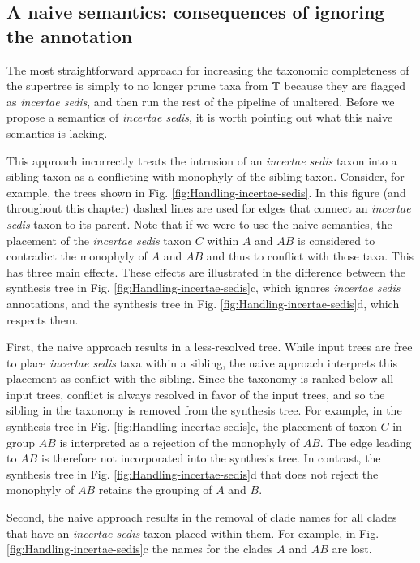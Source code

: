 \documentclass[english]{article}
\begin{document}
\subsection{A naive semantics: consequences of ignoring the annotation}

The most straightforward approach for increasing the taxonomic completeness of
the supertree is simply to no longer prune taxa from $\mbox{\ensuremath{\mathbb{T}}}$ because they are flagged
as \emph{incertae sedis}, and then run the rest of the pipeline of
\citet{redelings2017supertree} unaltered.  Before we propose a semantics of
\emph{incertae sedis}, it is worth pointing out what this naive semantics is lacking.

This approach incorrectly treats the intrusion of an \emph{incertae sedis} taxon
into a sibling taxon as a conflicting with monophyly of the sibling taxon.
Consider, for example, the trees shown in Fig. \ref{fig:Handling-incertae-sedis}.
In this figure (and throughout this chapter) dashed lines are used for edges that
connect an \emph{incertae sedis} taxon to its parent.
Note that if we were to use the naive semantics,  the placement of the
\emph{incertae sedis} taxon $C$ within $A$ and $AB$ is considered
to contradict the monophyly of $A$ and $AB$ and thus to conflict with those taxa.
This has three main effects.  These effects are illustrated in the difference
between the synthesis tree in Fig. \ref{fig:Handling-incertae-sedis}c, which
ignores \emph{incertae sedis} annotations, and the synthesis tree in Fig.
\ref{fig:Handling-incertae-sedis}d, which respects them.

First, the naive approach results in a less-resolved tree.  While input trees are
free to place \emph{incertae sedis} taxa within a sibling, the naive approach
interprets this placement as conflict with the sibling.  Since the taxonomy
is ranked below all input trees, conflict is always resolved in favor of the
input trees, and so the sibling in the taxonomy is removed from the synthesis
tree.  For example, in the synthesis tree in Fig.
\ref{fig:Handling-incertae-sedis}c, the placement of taxon $C$ in group $AB$ is
interpreted as a rejection of the monophyly of $AB$. The edge leading to $AB$ is
therefore not incorporated into the synthesis tree.  In contrast, the synthesis
tree in Fig. \ref{fig:Handling-incertae-sedis}d that does not reject the
monophyly of $AB$ retains the grouping of $A$ and $B$.

Second, the naive approach results in the removal of clade names for all clades that
have an \emph{incertae sedis} taxon placed within them.  For example, in Fig.
\ref{fig:Handling-incertae-sedis}c the names for the clades $A$ and $AB$ are lost.
\end{document}
